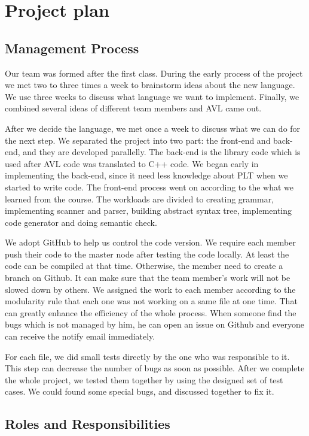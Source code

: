\section{Project plan}

\subsection{Management Process}

Our team was formed after the first class. During the early process of the project we met two to
three times a week to brainstorm ideas about the new language. We use three weeks to discuss what
language we want to implement. Finally, we combined several ideas of different team members and AVL
came out.

After we decide the language, we met once a week to discuss what we can do for the next step. We
separated the project into two part: the front-end and back-end, and they are developed parallelly.
The back-end is the library code which is used after AVL code was translated to C++ code. We began
early in implementing the back-end, since it need less knowledge about PLT when we started to write
code. The front-end process went on according to the what we learned from the course. The workloads
are divided to creating grammar, implementing scanner and parser, building abstract syntax tree,
implementing code generator and doing semantic check. 

We adopt GitHub to help us control the code version. We require each member push their code to the
master node after testing the code locally. At least the code can be compiled at that time.
Otherwise, the member need to create a branch on Github. It can make sure that the team member’s
work will not be slowed down by others. We assigned the work to each member according to the
modularity rule that each one was not working on a same file at one time. That can greatly enhance
the efficiency of the whole process. When someone find the bugs which is not managed by him, he can
open an issue on Github and everyone can receive the notify email immediately.

For each file, we did small tests directly by the one who was responsible to it. This step can
decrease the number of bugs as soon as possible. After we complete the whole project, we tested them
together by using the designed set of  test cases. We could found some special bugs, and discussed
together to fix it.

\subsection{Roles and Responsibilities}

